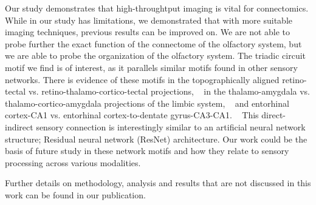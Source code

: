 \documentclass[../dissertation.tex]{subfiles}
\begin{document}
Our study demonstrates that high-throughtput imaging is vital for connectomics.
While in our study has limitations, we demonstrated that with more suitable imaging techniques, previous results can be improved on.
We are not able to probe further the exact function of the connectome of the olfactory system, but we are able to probe the organization of the olfactory system.
The triadic circuit motif we find is of interest, as it parallels similar motifs found in other sensory networks.
There is evidence of these motifs in the topographically aligned retino-tectal vs. retino-thalamo-cortico-tectal projections,
~\cite{mapseq096,mapseq097,mapseq098}
in the thalamo-amygdala vs. thalamo-cortico-amygdala projections of the limbic system,
~\cite{mapseq099,mapseq100}
and entorhinal cortex-CA1 vs. entorhinal cortex-to-dentate gyrus-CA3-CA1.
~\cite{mapseq101,mapseq102}
This direct-indirect sensory connection is interestingly similar to an artificial neural network structure; Residual neural network (ResNet) architecture.
Our work could be the basis of future study in these network motifs and how they relate to sensory processing across various modalities.

Further details on methodology, analysis and results that are not discussed in this work can be found in our publication.
~\cite{Chen.etal2021}
\end{document}

